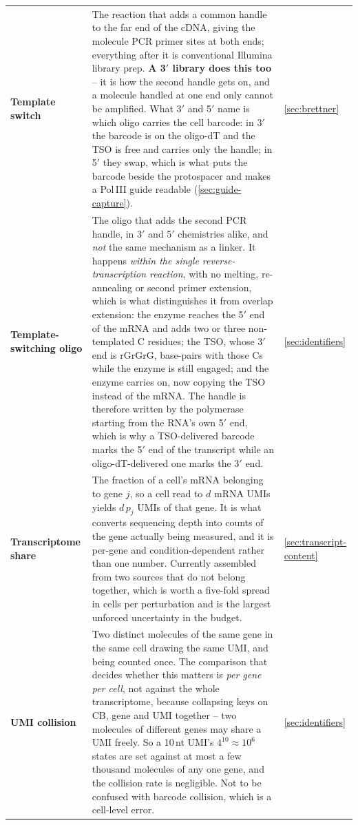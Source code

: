 \begin{longtable}{@{}>{\raggedright\arraybackslash}p{}>{\raggedright\arraybackslash}p{}>{\raggedright\arraybackslash}p{}@{}}
\textbf{Template switch} & The reaction that adds a common handle to the far end of the cDNA, giving the molecule PCR primer sites at both ends; everything after it is conventional Illumina library prep. \textbf{A 3$'$ library does this too} -- it is how the second handle gets on, and a molecule handled at one end only cannot be amplified. What 3$'$ and 5$'$ name is which oligo carries the cell barcode: in 3$'$ the barcode is on the oligo-dT and the TSO is free and carries only the handle; in 5$'$ they swap, which is what puts the barcode beside the protospacer and makes a Pol\,III guide readable (\cref{sec:guide-capture}). & \cref{sec:brettner} \\
\addlinespace[5pt]
\textbf{Template-switching oligo}\newline {\color{tcgray}(TSO)} & The oligo that adds the second PCR handle, in 3$'$ and 5$'$ chemistries alike, and \emph{not} the same mechanism as a linker. It happens \emph{within the single reverse-transcription reaction}, with no melting, re-annealing or second primer extension, which is what distinguishes it from overlap extension: the enzyme reaches the 5$'$ end of the mRNA and adds two or three non-templated C residues; the TSO, whose 3$'$ end is rGrGrG, base-pairs with those Cs while the enzyme is still engaged; and the enzyme carries on, now copying the TSO instead of the mRNA. The handle is therefore written by the polymerase starting from the RNA's own 5$'$ end, which is why a TSO-delivered barcode marks the 5$'$ end of the transcript while an oligo-dT-delivered one marks the 3$'$ end. & \cref{sec:identifiers} \\
\addlinespace[5pt]
\textbf{Transcriptome share}\newline {\color{tcgray}($p_j$)} & The fraction of a cell's mRNA belonging to gene $j$, so a cell read to $d$ mRNA UMIs yields $d\,p_j$ UMIs of that gene. It is what converts sequencing depth into counts of the gene actually being measured, and it is per-gene and condition-dependent rather than one number. Currently assembled from two sources that do not belong together, which is worth a five-fold spread in cells per perturbation and is the largest unforced uncertainty in the budget. & \cref{sec:transcript-content} \\
\addlinespace[5pt]
\textbf{UMI collision} & Two distinct molecules of the same gene in the same cell drawing the same UMI, and being counted once. The comparison that decides whether this matters is \emph{per gene per cell}, not against the whole transcriptome, because collapsing keys on CB, gene and UMI together -- two molecules of different genes may share a UMI freely. So a 10\,nt UMI's $4^{10}\approx10^{6}$ states are set against at most a few thousand molecules of any one gene, and the collision rate is negligible. Not to be confused with barcode collision, which is a cell-level error. & \cref{sec:identifiers} \\

\end{longtable}
